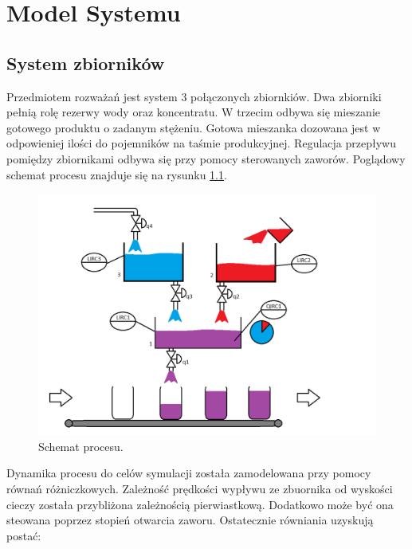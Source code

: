 \chapter{Model Systemu}
\section{System zbiorników}
\indent Przedmiotem rozważań jest system 3 połączonych zbiornkiów. Dwa zbiorniki pełnią rolę rezerwy wody oraz koncentratu. W trzecim odbywa się mieszanie gotowego produktu o zadanym stężeniu. Gotowa mieszanka dozowana jest w odpowieniej ilości do pojemników na taśmie produkcyjnej. Regulacja przepływu pomiędzy zbiornikami odbywa się przy pomocy sterowanych zaworów. Poglądowy schemat procesu znajduje się na rysunku \ref{fig:Proces}.
\begin{figure}[H]
	\centering
	\includegraphics[scale = 0.5]{fig/Proces_schema_updated.png}
	\caption{Schemat procesu.}
	\label{fig:Proces}
\end{figure}

Dynamika procesu do celów symulacji została zamodelowana przy pomocy równań różniczkowych. Zależność prędkości wypływu ze zbuornika od wyskości cieczy została przybliżona zależnością pierwiastkową. Dodatkowo może być ona steowana poprzez stopień otwarcia zaworu. Ostatecznie równiania uzyskują postać:


